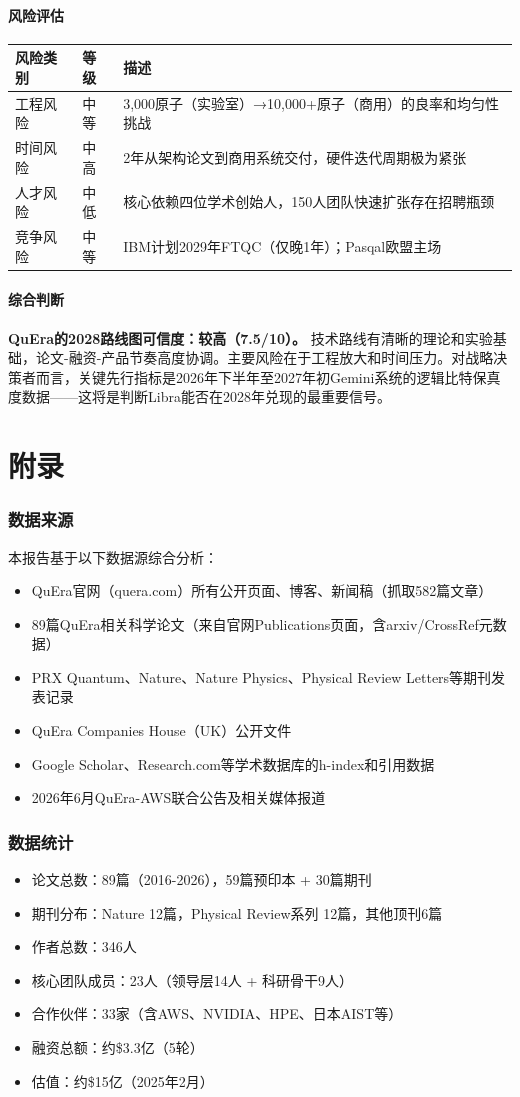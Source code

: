 \documentclass[11pt,a4paper]{ctexart}
\begin{document}
\subsection{风险评估}

\begin{center}
\begin{tabular}{p{2.5cm}p{6cm}p{8cm}}
\toprule
\textbf{风险类别} & \textbf{等级} & \textbf{描述} \\
\midrule
工程风险 & 中等 & 3,000原子（实验室）→10,000+原子（商用）的良率和均匀性挑战 \\
时间风险 & 中高 & 2年从架构论文到商用系统交付，硬件迭代周期极为紧张 \\
人才风险 & 中低 & 核心依赖四位学术创始人，150人团队快速扩张存在招聘瓶颈 \\
竞争风险 & 中等 & IBM计划2029年FTQC（仅晚1年）；Pasqal欧盟主场 \\
\bottomrule
\end{tabular}
\end{center}

\subsection{综合判断}
\textbf{QuEra的2028路线图可信度：较高（7.5/10）。} 技术路线有清晰的理论和实验基础，论文-融资-产品节奏高度协调。主要风险在于工程放大和时间压力。对战略决策者而言，关键先行指标是2026年下半年至2027年初Gemini系统的逻辑比特保真度数据——这将是判断Libra能否在2028年兑现的最重要信号。

\part{附录}
\section{数据来源}
本报告基于以下数据源综合分析：
\begin{itemize}
\item QuEra官网（quera.com）所有公开页面、博客、新闻稿（抓取582篇文章）
\item 89篇QuEra相关科学论文（来自官网Publications页面，含arxiv/CrossRef元数据）
\item PRX Quantum、Nature、Nature Physics、Physical Review Letters等期刊发表记录
\item QuEra Companies House（UK）公开文件
\item Google Scholar、Research.com等学术数据库的h-index和引用数据
\item 2026年6月QuEra-AWS联合公告及相关媒体报道
\end{itemize}

\section{数据统计}
\begin{itemize}
\item 论文总数：89篇（2016-2026），59篇预印本 + 30篇期刊
\item 期刊分布：Nature 12篇，Physical Review系列 12篇，其他顶刊6篇
\item 作者总数：346人
\item 核心团队成员：23人（领导层14人 + 科研骨干9人）
\item 合作伙伴：33家（含AWS、NVIDIA、HPE、日本AIST等）
\item 融资总额：约\$3.3亿（5轮）
\item 估值：约\$15亿（2025年2月）
\end{itemize}
\end{document}
